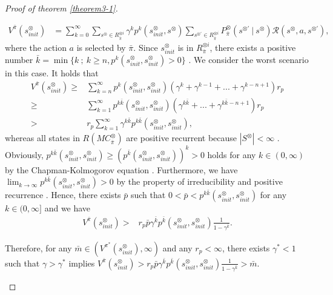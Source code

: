 \documentclass[a4j,12pt,oneside,openany,english,dvipdfmx]{jsbook}
\begin{document}
\begin{proof}[Proof of theorem \ref{theorem3-1}]
\begin{enumerate}
    \begin{align}
      V^{\bar{\pi}}(s^{\otimes}_{init})
       &= \sum_{k=0}^{\infty} \sum_{s^{\otimes} \in R^{\otimes i}_{\bar{\pi}}} \gamma^k p^k(s^{\otimes}_{init}, s^{\otimes}) \sum_{s^{\otimes \prime} \in R^{\otimes i}_{\bar{\pi}}}  P^{\otimes}_{\bar{\pi}}(s^{\otimes \prime}\ |\ s^{\otimes}) \mathcal{R}(s^{\otimes}, a, s^{\otimes \prime}), \nonumber
    \end{align}
    where the action $a$ is selected by $\bar{\pi}$. Since $s^{\otimes}_{init}$ is in $R^{\otimes i}_{\bar{\pi}}$, there exists a positive number $\bar{k} = \min \{ k\ ;\ k \geq n, p^{k}(s^{\otimes}_{init}, s^{\otimes}_{init}) > 0 \}$ \cite{ESS}. We consider the worst scenario in this case. It holds that
    \begin{align}
      V^{\bar{\pi}}(s^{\otimes}_{init})
       \geq & \sum_{k=n}^{\infty} p^{k}(s^{\otimes}_{init}, s^{\otimes}_{init})(\gamma^k + \gamma^{k - 1} +...+ \gamma^{k - n + 1})r_p \nonumber \\
       \geq & \sum_{k=1}^{\infty} p^{k \bar{k}}(s^{\otimes}_{init}, s^{\otimes}_{init}) (\gamma^{k \bar{k}} +...+ \gamma^{k \bar{k} - n + 1})r_p \nonumber \\
       > & r_p \sum_{k=1}^{\infty} \gamma^{k \bar{k}} p^{k \bar{k}}(s^{\otimes}_{init}, s^{\otimes}_{init}), \nonumber
    \end{align}
whereas all states in $R(MC^{\otimes}_{\bar{\pi}})$ are positive recurrent because $|S^{\otimes}| < \infty$ \cite{ISP}. Obviously, $p^{k \bar{k}}(s^{\otimes}_{init}, s^{\otimes}_{init}) \geq (p^{\bar{k}}(s^{\otimes}_{init}, s^{\otimes}_{init}))^k > 0$ holds for any $k \in (0, \infty)$ by the Chapman-Kolmogorov equation \cite{ESS}. Furthermore, we have $\lim_{k \rightarrow \infty} p^{k \bar{k}}(s^{\otimes}_{init}, s^{\otimes}_{init}) > 0$ by the property of irreducibility and positive recurrence \cite{SM}. Hence, there exists $\bar{p}$ such that $0<\bar{p}<p^{k \bar{k}}(s^{\otimes}_{init}, s^{\otimes}_{init})$ for any $k \in (0, \infty]$ and we have
    \begin{align}
       V^{\bar{\pi}}(s^{\otimes}_{init}) > & r_p \bar{p} \gamma^{\bar{k}} p^{\bar{k}}(s^{\otimes}_{init},s^{\otimes}_{init}) \frac{1}{ 1 - \gamma^{\bar{k}} }. \nonumber
    \end{align}

    Therefore, for any $\bar{m} \in (V^{\pi^{\ast}}(s^{\otimes}_{init}), \infty)$ and any $r_p < \infty$, there exists $\gamma^{\ast}<1$ such that $\gamma > \gamma^{\ast}$ implies $V^{\bar{\pi}}(s^{\otimes}_{init}) > r_p \bar{p} \gamma^{\bar{k}} p^{\bar{k}}(s^{\otimes}_{init},s^{\otimes}_{init}) \frac{1}{ 1 - \gamma^{\bar{k}} } > \bar{m}.$


\end{enumerate}
\end{proof}
\end{document}
